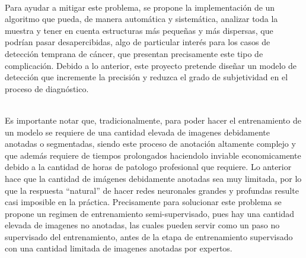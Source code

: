 \documentclass[12pt,letterpaper,final, openany]{scrbook}
\begin{document}
\\
Para ayudar a mitigar este problema, se propone la implementación de un algoritmo que pueda, de manera automática y sistemática, analizar toda la muestra y tener en cuenta estructuras más pequeñas y más dispersas, que podrían pasar desapercibidas, algo de particular interés para los casos de detección temprana de cáncer, que presentan precisamente este tipo de complicación. Debido a lo anterior, este proyecto pretende diseñar un modelo de detección que incremente la precisión y reduzca el grado de subjetividad en el proceso de diagnóstico.

\\

Es importante notar que, tradicionalmente, para poder hacer el entrenamiento de un modelo se requiere de una cantidad elevada de imagenes debidamente anotadas o segmentadas, siendo este proceso de anotación  altamente complejo y que además requiere de tiempos prolongados haciendolo inviable economicamente debido a la cantidad de horas de patologo profesional que requiere. Lo anterior hace que la cantidad de imágenes debidamente anotadas sea muy limitada, por lo que la respuesta “natural” de hacer redes neuronales grandes y profundas resulte casi imposible en la práctica. Precisamente para solucionar este problema se propone un regimen de entrenamiento semi-supervisado, pues hay una cantidad elevada de imagenes no anotadas, las cuales pueden servir como un paso no supervisado del entrenamiento, antes de la etapa de entrenamiento supervisado con una cantidad limitada de imagenes anotadas por expertos.
\\
\end{document}
